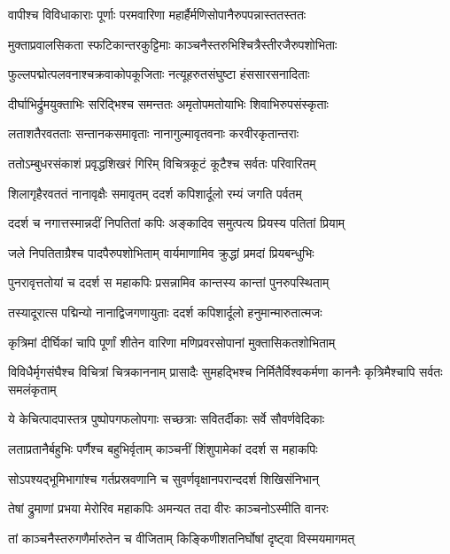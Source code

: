 \twolineshloka
{वापीश्च विविधाकाराः पूर्णाः परमवारिणा}
{महार्हैर्मणिसोपानैरुपपन्नास्ततस्ततः} %

\twolineshloka
{मुक्ताप्रवालसिकता स्फटिकान्तरकुट्टिमाः}
{काञ्चनैस्तरुभिश्चित्रैस्तीरजैरुपशोभिताः} %

\twolineshloka
{फुल्लपद्मोत्पलवनाश्चक्रवाकोपकूजिताः}
{नत्यूहरुतसंघुष्टा हंससारसनादिताः} %

\twolineshloka
{दीर्घाभिर्द्रुमयुक्ताभिः सरिद्भिश्च समन्ततः}
{अमृतोपमतोयाभिः शिवाभिरुपसंस्कृताः} %

\twolineshloka
{लताशतैरवतताः सन्तानकसमावृताः}
{नानागुल्मावृतवनाः करवीरकृतान्तराः} %

\twolineshloka
{ततोऽम्बुधरसंकाशं प्रवृद्धशिखरं गिरिम्}
{विचित्रकूटं कूटैश्च सर्वतः परिवारितम्} %

\twolineshloka
{शिलागृहैरवततं नानावृक्षैः समावृतम्}
{ददर्श कपिशार्दूलो रम्यं जगति पर्वतम्} %

\twolineshloka
{ददर्श च नगात्तस्मान्नदीं निपतितां कपिः}
{अङ्कादिव समुत्पत्य प्रियस्य पतितां प्रियाम्} %

\twolineshloka
{जले निपतिताग्रैश्च पादपैरुपशोभिताम्}
{वार्यमाणामिव क्रुद्धां प्रमदां प्रियबन्धुभिः} %

\twolineshloka
{पुनरावृत्ततोयां च ददर्श स महाकपिः}
{प्रसन्नामिव कान्तस्य कान्तां पुनरुपस्थिताम्} %

\twolineshloka
{तस्यादूरात्स पद्मिन्यो नानाद्विजगणायुताः}
{ददर्श कपिशार्दूलो हनुमान्मारुतात्मजः} %

\twolineshloka
{कृत्रिमां दीर्घिकां चापि पूर्णां शीतेन वारिणा}
{मणिप्रवरसोपानां मुक्तासिकतशोभिताम्} %

\threelineshloka
{विविधैर्मृगसंघैश्च विचित्रां चित्रकाननाम्}
{प्रासादैः सुमहद्भिश्च निर्मितैर्विश्वकर्मणा}
{काननैः कृत्रिमैश्चापि सर्वतः समलंकृताम्} %

\twolineshloka
{ये केचित्पादपास्तत्र पुष्पोपगफलोपगाः}
{सच्छत्राः सवितर्दीकाः सर्वे सौवर्णवेदिकाः} %

\twolineshloka
{लताप्रतानैर्बहुभिः पर्णैश्च बहुभिर्वृताम्}
{काञ्चनीं शिंशुपामेकां ददर्श स महाकपिः} %

\twolineshloka
{सोऽपश्यद्भूमिभागांश्च गर्तप्रस्रवणानि च}
{सुवर्णवृक्षानपरान्ददर्श शिखिसंनिभान्} %

\twolineshloka
{तेषां द्रुमाणां प्रभया मेरोरिव महाकपिः}
{अमन्यत तदा वीरः काञ्चनोऽस्मीति वानरः} %

\twolineshloka
{तां काञ्चनैस्तरुगणैर्मारुतेन च वीजिताम्}
{किङ्किणीशतनिर्घोषां दृष्ट्वा विस्मयमागमत्} %

